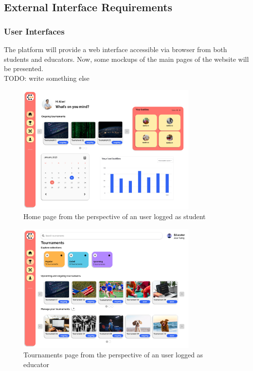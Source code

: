 \subsection{External Interface Requirements}
\subsubsection{User Interfaces}
The platform will provide a web interface accessible via browser from both students and educators. Now, some mockups of the main pages of the website will be presented.\\
TODO: write something else
\begin{figure}[H]
    \centering
    \includegraphics[width=0.8\textwidth]{Mockups/3_student_homepage.png}
    \caption{Home page from the perspective of an user logged as student}
\end{figure}

\begin{figure}[H]
    \centering
    \includegraphics[width=0.8\textwidth]{Mockups/5_educator_tournaments.png}
    \caption{Tournaments page from the perspective of an user logged as educator}
\end{figure}

